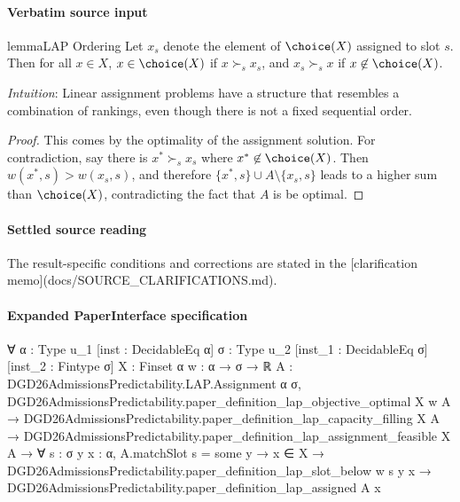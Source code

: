 \documentclass[10pt]{article}
\begin{document}
\paragraph{Verbatim source input}
\begin{ReviewVerbatim}
\begin{restatable}{lemma}{LAP Ordering}
\label{lem:lap-ordering}
Let $x_{s}$ denote the element of $\choice(X)$ assigned to slot $s$. Then for all $x \in X$, $x \in \choice(X)$ if $x \succ_s x_s$, and $x_s \succ_s x$ if $x \not\in \choice(X)$.
\end{restatable}

\textit{Intuition}: Linear assignment problems have a structure that resembles a combination of rankings, even though there is not a fixed sequential order.

\begin{proof}
This comes by the optimality of the assignment solution. For contradiction, say there is $x^* \succ_s x_s$ where $x^* \not\in \choice(X)$. Then $w(x^*, s) > w(x_s, s)$, and therefore $\{x^*, s\} \cup A \setminus \{x_s, s\}$ leads to a higher sum than $\choice(X)$, contradicting the fact that $A$ is be optimal.
\end{proof}
\end{ReviewVerbatim}

\paragraph{Settled source reading}
The result-\allowbreak{}specific conditions and corrections are stated in the [clarification memo](docs/\allowbreak{}SOURCE\_\allowbreak{}CLARIFICATIONS.\allowbreak{}md).\allowbreak{}

\paragraph{Expanded PaperInterface specification}
\begin{ReviewVerbatim}
∀ {α : Type u_1} [inst : DecidableEq α] {σ : Type u_2} [inst_1 : DecidableEq σ] [inst_2 : Fintype σ] {X : Finset α}
  {w : α → σ → ℝ} {A : DGD26AdmissionsPredictability.LAP.Assignment α σ},
  DGD26AdmissionsPredictability.paper_definition_lap_objective_optimal X w A →
    DGD26AdmissionsPredictability.paper_definition_lap_capacity_filling X A →
      DGD26AdmissionsPredictability.paper_definition_lap_assignment_feasible X A →
        ∀ {s : σ} {y x : α},
          A.matchSlot s = some y →
            x ∈ X →
              DGD26AdmissionsPredictability.paper_definition_lap_slot_below w s y x →
                DGD26AdmissionsPredictability.paper_definition_lap_assigned A x
\end{ReviewVerbatim}
\end{document}
